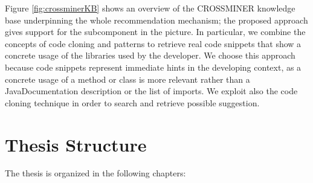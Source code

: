 Figure \ref{fig:crossminerKB} shows an overview of the CROSSMINER 
knowledge base underpinning the whole recommendation mechanism; the proposed 
approach gives support for the  subcomponent in the 
picture. In particular, we combine the concepts of code cloning and patterns to 
retrieve real code snippets that show a concrete usage of the libraries used by 
the developer. We choose this approach because code snippets represent 
immediate hints in the developing context, as a concrete usage of a method or 
class is more relevant rather than a JavaDocumentation description or the list 
of imports. We exploit also the code cloning technique in order to search and 
retrieve possible suggestion.

\section{Thesis Structure}

The thesis is organized in the following chapters:

